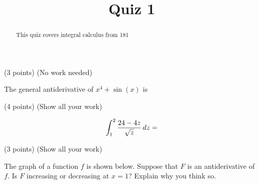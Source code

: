 \documentclass[handout]{ximera}
\title{Quiz 1}
\begin{document}
\begin{abstract}
This quiz covers integral calculus from 181
\end{abstract}
\maketitle


\begin{question}
	
	(3 points)	(No work needed)
		
		The general antiderivative of $x^4 + \sin(x)$ is 
	\end{question}
	
\begin{question}
	
	(4 points)	(Show all your work)
	
	\[\int_1^2 \frac{24-4z}{\sqrt{z}} \mathop{}\!d z = \]
	\vspace{4.5 in}
\end{question}



\begin{question}
	
	(3 points)	(Show all your work)
	
	The graph of a function $f$ is shown below.  Suppose that $F$ is an antiderivative of $f$.   Is $F$ increasing or decreasing at $x=1$?  Explain why you think so.
	
		\begin{image}
		\end{image}
		
			\vspace{4 in}
\end{question}
	
\end{document}
